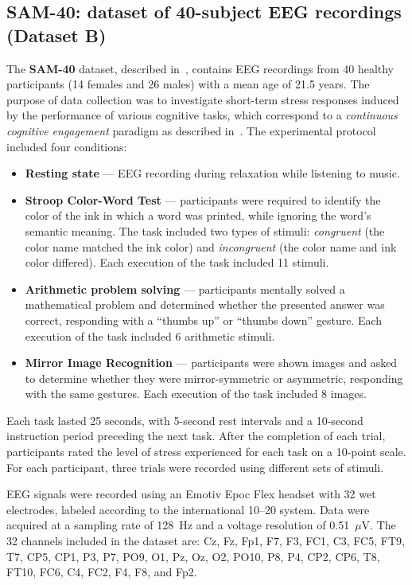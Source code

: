 \documentclass[10pt,letterpaper]{article}
\begin{document}
\subsection*{SAM-40: dataset of 40-subject EEG recordings (Dataset B)}

The \textbf{SAM-40} dataset, described in~\cite{ghosh2022sam40}, contains EEG recordings from 40 healthy participants (14 females and 26 males) with a mean age of 21.5 years. The purpose of data collection was to investigate short-term stress responses induced by the performance of various cognitive tasks, which correspond to a \textit{continuous cognitive engagement} paradigm as described in~\cite{chen2025hybrid}. The experimental protocol included four conditions:

\begin{itemize}
  \item \textbf{Resting state} --- EEG recording during relaxation while listening to music.
  \item \textbf{Stroop Color-Word Test} --- participants were required to identify the color of the ink in which a word was printed, while ignoring the word's semantic meaning. The task included two types of stimuli: \textit{congruent} (the color name matched the ink color) and \textit{incongruent} (the color name and ink color differed). Each execution of the task included 11 stimuli.
  \item \textbf{Arithmetic problem solving} --- participants mentally solved a mathematical problem and determined whether the presented answer was correct, responding with a ``thumbs up'' or ``thumbs down'' gesture. Each execution of the task included 6 arithmetic stimuli.
  \item \textbf{Mirror Image Recognition} --- participants were shown images and asked to determine whether they were mirror-symmetric or asymmetric, responding with the same gestures. Each execution of the task included 8 images.
\end{itemize}

Each task lasted 25 seconds, with 5-second rest intervals and a 10-second instruction period preceding the next task. After the completion of each trial, participants rated the level of stress experienced for each task on a 10-point scale. For each participant, three trials were recorded using different sets of stimuli.

EEG signals were recorded using an Emotiv Epoc Flex headset with 32 wet electrodes, labeled according to the international 10--20 system. Data were acquired at a sampling rate of 128~Hz and a voltage resolution of 0.51~$\mu$V. The 32 channels included in the dataset are: Cz, Fz, Fp1, F7, F3, FC1, C3, FC5, FT9, T7, CP5, CP1, P3, P7, PO9, O1, Pz, Oz, O2, PO10, P8, P4, CP2, CP6, T8, FT10, FC6, C4, FC2, F4, F8, and Fp2.
\end{document}
